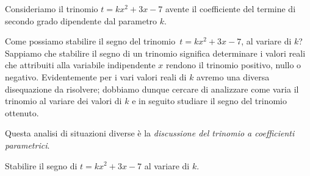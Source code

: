 Consideriamo il trinomio $t=kx^2+3x-7$ avente il coefficiente del termine di secondo grado dipendente dal parametro $k$.

Come possiamo stabilire il segno del trinomio~$t=kx^2+3x-7$, al variare di $k$?
Sappiamo che stabilire il segno di un trinomio significa determinare i valori reali che attribuiti alla variabile indipendente $x$ rendono il trinomio positivo, nullo o negativo. Evidentemente per i vari valori reali di $k$ avremo una diversa disequazione da risolvere; dobbiamo dunque cercare di analizzare come varia il trinomio al variare dei valori di $k$ e in seguito studiare il segno del trinomio ottenuto.

Questa analisi di situazioni diverse è la \textit{discussione del trinomio a coefficienti parametrici}.

\begin{exrig}
\begin{esempio}
Stabilire il segno di $t=kx^2+3x-7$ al variare di $ k $.


\end{esempio}
\end{exrig}
